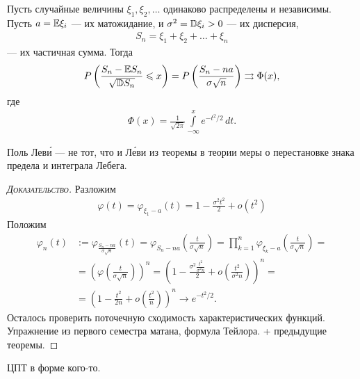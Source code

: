 \documentclass[../main.tex]{subfiles}
\begin{document}
\begin{thm}
 Пусть случайные величины $ \xi_1, \xi_2, \ldots $  одинаково распределены и независимы. Пусть $ a = \mathbb E \xi_i $ --- их матожидание, и  $ \sigma^{2} = \mathbb D \xi_i > 0 $  --- их дисперсия,
 \begin{align*}
  S_n = \xi_1 + \xi_2 + \ldots + \xi_n
 \end{align*} --- их частичная сумма. Тогда
 \begin{align*}
  P\left(\frac{S_n - \mathbb E S_n}{\sqrt{\mathbb D S_n}} \leqslant x\right) = P \left( \frac{S_n - na}{\sigma \sqrt n} \right) \rightrightarrows \Phi(x),
 \end{align*} где
 \begin{align*}
  \Phi(x) = \frac{1}{\sqrt{2\pi}} \int\limits_{-\infty}^{x} e^{-t^{2} / 2}\,dt.
 \end{align*}
\end{thm}
\begin{remrk*}
 Поль Лев\'{и} --- не тот, что и Л\'{е}ви из теоремы в теории меры о перестановке знака предела и интеграла Лебега.
\end{remrk*}
\begin{proof}[\normalfont\textsc{Доказательство}]
 Разложим
 \begin{align*}
  \varphi(t) = \varphi_{\xi_1 - a}(t) = 1 - \frac{\sigma^{2}t^{2}}{2} + o(t^{2})
 \end{align*} Положим
 \begin{align*}
  \varphi_n(t) &:= \varphi_{\frac{S_n - na}{\sigma \sqrt n}}(t) = \varphi_{S_n - na} \left( \frac{t}{\sigma \sqrt n} \right) = \prod_{k=1}^{n} \varphi_{\xi_k - a} \left( \frac{t}{\sigma \sqrt n} \right) = \\
  &= \left(\varphi \left( \frac{t}{\sigma \sqrt n} \right) \right)^{n} = \left( 1- \frac{\sigma^{2} \frac{t^{2}}{\sigma^{2} n}}{2} + o \left( \frac{t^{2}}{\sigma^{2} n} \right) \right)^{n} = \\
  &= \left( 1 - \frac{t^{2}}{2n} + o \left( \frac{t^{2}}{n} \right) \right)^{n} \to e^{-t^{2} / 2}.
 \end{align*} Осталось проверить поточечную сходимость характеристических функций. Упражнение из первого семестра матана, формула Тейлора. + предыдущие теоремы.
\end{proof}

ЦПТ в форме кого-то.
\end{document}
